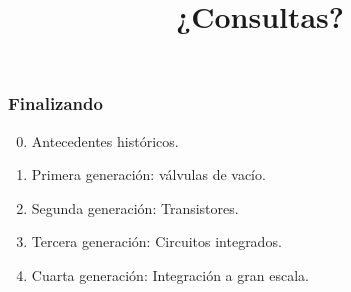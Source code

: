 \documentclass[11pt,a4paper,spanish]{beamer}
\begin{document}
\begin{frame}

    \frametitle{Finalizando}

\begin{enumerate}

    \setcounter{enumi}{-1}

    \item Antecedentes históricos.

    \item Primera generación: válvulas de vacío.

    \item Segunda generación: Transistores.

    \item Tercera generación: Circuitos integrados.

    \item Cuarta generación: Integración a gran escala.

\end{enumerate}

\end{frame}

\begin{frame}

\title{¿Consultas?}
\maketitle

\end{frame}

\end{document}
